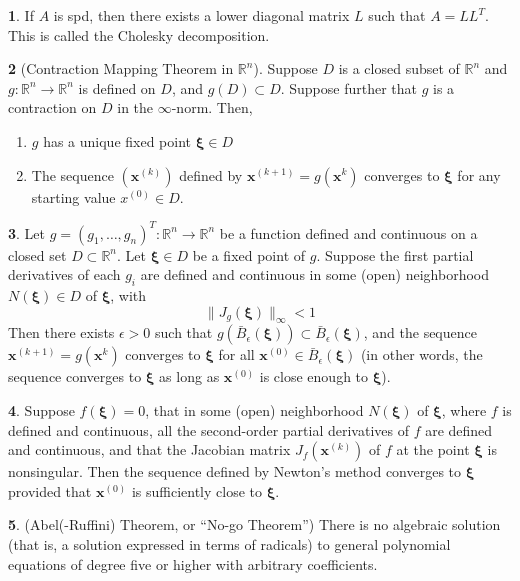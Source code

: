 \documentclass[12pt]{article}
\theoremstyle{definition}
\newtheorem{theorem}{\color{ForestGreen}{\textbf{Theorem}}}
\newcommand{\e}{\epsilon}
\newcommand{\R}{\mathbb{R}}
\newcommand{\norm}[1]{\lVert#1\rVert}
\newcommand{\x}{\bm{x}}
\newcommand{\xib}{\bm{\xi}}
\begin{document}
\begin{theorem}
If $A$ is spd, then there exists a lower diagonal matrix $L$ such that $A = L L^T$. This is called the Cholesky decomposition.
\end{theorem}

\begin{theorem}[Contraction Mapping Theorem in $\R^n$]
Suppose $D$ is a closed subset of $\R^n$ and $g: \R^n \to \R^n$ is defined on $D$, and $g(D) \subset D$. Suppose further that $g$ is a contraction on $D$ in the $\infty$-norm. Then,
\begin{enumerate}
\item $g$ has a unique fixed point $\xib \in D$
\item The sequence $(\x^{(k)})$ defined by $\x^{(k+1)} = g(\x^{k})$ converges to $\xib$ for any starting value $x^{(0)} \in D$.
\end{enumerate}
\end{theorem}

\begin{theorem}
Let $g = (g_1, \ldots, g_n)^T : \R^n \to \R^n$ be a function defined and continuous on a closed set $D \subset \R^n$. Let $\xib \in D$ be a fixed point of $g$. Suppose the first partial derivatives of each $g_i$ are defined and continuous in some (open) neighborhood $N(\xib) \in D$ of $\xib$, with
\begin{equation}
\norm{J_g(\xib)}_\infty < 1
\end{equation}
Then there exists $\e > 0$ such that $g (\bar B_\e(\xib)) \subset \bar B_\e(\xib)$, and the sequence $\x^{(k+1)} = g(\x^{k})$ converges to $\xib$ for all $\x^{(0)} \in \bar B_\e(\xib)$ (in other words, the sequence converges to $\xib$ as long as $\x^{(0)}$ is close enough to $\xib$).
\end{theorem}

\begin{theorem}
Suppose $f(\xib) = 0$, that in some (open) neighborhood $N(\xib)$ of $\xib$, where $f$ is defined and continuous, all the second-order partial derivatives of $f$ are defined and continuous, and that the Jacobian matrix $J_f(\x^{(k)})$ of $f$ at the point $\xib$ is nonsingular. Then the sequence defined by Newton's method converges to $\xib$ provided that $\x^{(0)}$ is sufficiently close to $\xib$.
\end{theorem}

\begin{theorem}(Abel(-Ruffini) Theorem, or ``No-go Theorem'')
There is no algebraic solution (that is, a solution expressed in terms of radicals) to general polynomial equations of degree five or higher with arbitrary coefficients.
\end{theorem}
\end{document}
